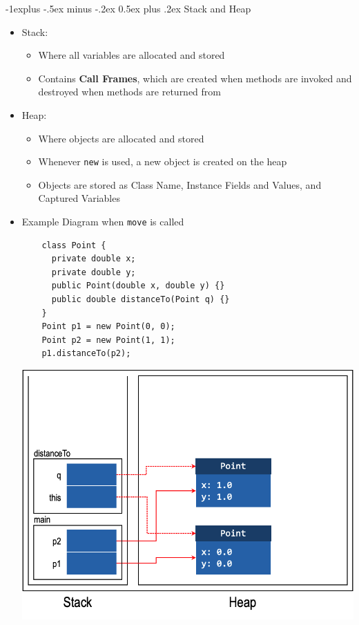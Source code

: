 \documentclass[10pt, landscape]{article}
\makeatletter
\renewcommand{\section}{\@startsection{section}{1}{0mm}%
                                {-1ex plus -.5ex minus -.2ex}%
                                {0.5ex plus .2ex}%
                                {\normalfont\large\bfseries}}
\renewcommand{\section}{\@startsection{section}{2}{0mm}%
                                {-1explus -.5ex minus -.2ex}%
                                {0.5ex plus .2ex}%
                                {\normalfont\normalsize\bfseries}}
\makeatother
\begin{document}
\begin{multicols*}{4}
\section{Stack and Heap}
\begin{itemize}
    \item Stack:
        \begin{itemize}
            \item Where all variables are allocated and stored
            \item Contains \textbf{Call Frames}, which are created when methods are invoked and destroyed when methods are returned from
        \end{itemize}
    \item Heap:
        \begin{itemize}
            \item Where objects are allocated and stored
            \item Whenever \lstinline{new} is used, a new object is created on the heap
            \item Objects are stored as Class Name, Instance Fields and Values, and Captured Variables
        \end{itemize}
    \item Example Diagram when \lstinline{move} is called
    \begin{lstlisting}
    class Point {
      private double x;
      private double y;
      public Point(double x, double y) {}
      public double distanceTo(Point q) {}
    }
    Point p1 = new Point(0, 0);
    Point p2 = new Point(1, 1);
    p1.distanceTo(p2);
    \end{lstlisting}
    \includegraphics[width=\linewidth]{006b.png}

\end{itemize}
\end{multicols*}
\end{document}
